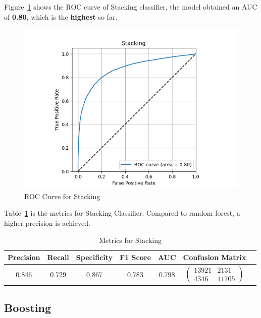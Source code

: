 Figure~\ref{fig:roc-stacking} shows the ROC curve of Stacking classifier, the model obtained an AUC of \textbf{0.80}, which is the \textbf{highest} so far.

\begin{figure}
    \centering
    \includegraphics[width=1\linewidth]{docs//assets/individual_roc_curve_Stacking.png}
    \caption{ROC Curve for Stacking}
    \label{fig:roc-stacking}
\end{figure}

Table~\ref{tab:stacking} is the metrics for Stacking Classifier. Compared to random forest, a higher precision is achieved.

\begin{table}
\centering
\begin{tabular}{|c|c|c|c|c|c|c}
\hline
\textbf{Precision} & \textbf{Recall} & \textbf{Specificity} & \textbf{F1 Score} & \textbf{AUC} & \textbf{Confusion Matrix} \\
\hline
0.846 & 0.729 & 0.867 & 0.783 & 0.798 & $\left(\begin{array}{cc} 13921 & 2131 \\ 4346 & 11705 \end{array}\right)$ \\ 
\hline
\end{tabular}
\caption{Metrics for Stacking}
\label{tab:stacking}
\end{table}

\subsection{Boosting}

